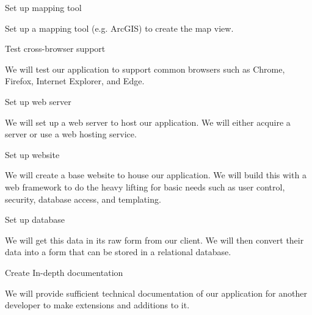 \begin{list}{-}{}
\item Set up mapping tool
\begin{list}{-}{}
\item Set up a mapping tool (e.g. ArcGIS) to create the map view.
\end{list}
\item Test cross-browser support
\begin{list}{-}{}
\item We will test our application to support common browsers such as Chrome, Firefox, Internet Explorer, and Edge.
\end{list}
\item Set up web server
\begin{list}{-}{}
\item We will set up a web server to host our application. We will either acquire a server or use a web hosting service.
\end{list}
\item Set up website
\begin{list}{-}{}
\item We will create a base website to house our application.
We will build this with a web framework to do the heavy lifting for basic needs such as user control, security, database access, and templating.
\end{list}
\item Set up database
\begin{list}{-}{}
\item We will get this data in its raw form from our client.
We will then convert their data into a form that can be stored in a relational database.
\end{list}
\item Create In-depth documentation
\begin{list}{-}{}
\item We will provide sufficient technical documentation of our application for another developer to make extensions and additions to it.
\end{list}
\end{list}

